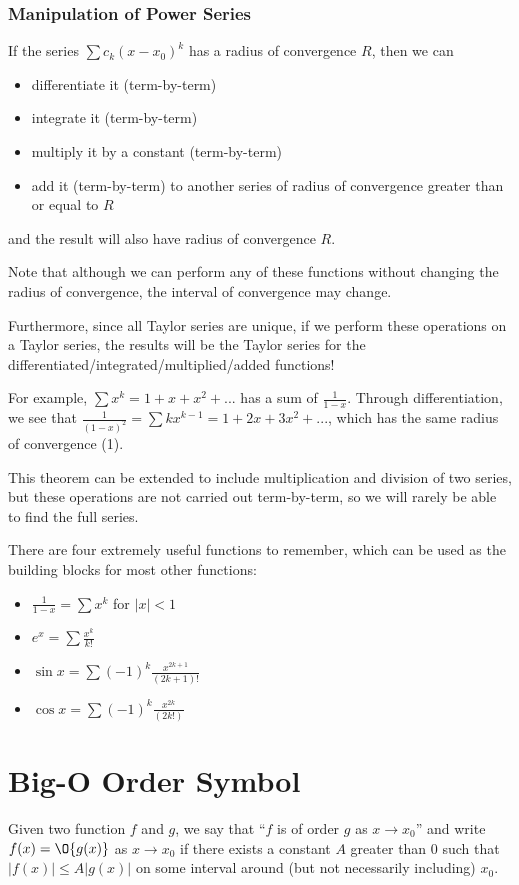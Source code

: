 \documentclass[12pt]{article}
\begin{document}
\subsubsection*{Manipulation of Power Series}
If the series $\sum c_k (x-x_0)^k$ has a radius of convergence $R$, then we can
\begin{itemize}
\item differentiate it (term-by-term)
\item integrate it (term-by-term)
\item multiply it by a constant (term-by-term)
\item add it (term-by-term) to another series of radius of convergence greater than or equal to $R$
\end{itemize}
and the result will also have radius of convergence $R$.

Note that although we can perform any of these functions without changing the radius of convergence, the interval of convergence may change.

Furthermore, since all Taylor series are unique, if we perform these operations on a Taylor series, the results will be the Taylor series for the differentiated/integrated/multiplied/added functions!

For example, $\sum x^k = 1 + x + x^2 + ...$ has a sum of $\frac{1}{1-x}$. Through differentiation, we see that $\frac{1}{(1-x)^2} = \sum kx^{k-1} = 1 + 2x + 3x^2 + ...$, which has the same radius of convergence (1).

This theorem can be extended to include multiplication and division of two series, but these operations are not carried out term-by-term, so we will rarely be able to find the full series.

There are four extremely useful functions to remember, which can be used as the building blocks for most other functions:
\begin{itemize}
\item $\frac{1}{1-x} = \sum x^k$ for $|x| < 1$
\item $e^x = \sum \frac{x^k}{k!}$
\item $\sin x = \sum (-1)^k \frac{x^{2k+1}}{(2k+1)!}$
\item $\cos x = \sum (-1)^k \frac{x^{2k}}{(2k!)}$
\end{itemize}

\section*{Big-O Order Symbol}
 Given two function $f$ and $g$, we say that ``$f$ is of order $g$ as $x \to x_0$'' and write $f(x) = \O{g(x)}$ as $x \to x_0$ if there exists a constant $A$ greater than 0 such that $|f(x)| \leq A |g(x)|$ on some interval around (but not necessarily including) $x_0$.
\end{document}
